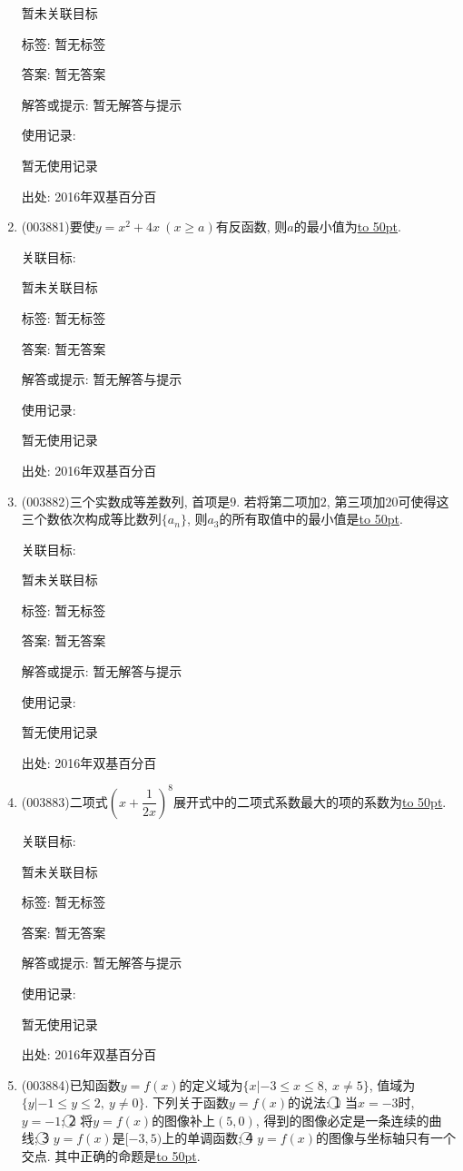 \documentclass[10pt,a4paper]{article}
\newcommand{\blank}[1]{\underline{\hbox to #1pt{}}}
\begin{document}
\begin{enumerate}[1.]
暂未关联目标



标签: 暂无标签

答案: 暂无答案

解答或提示: 暂无解答与提示

使用记录:

暂无使用记录


出处: 2016年双基百分百
\item { (003881)}要使$y=x^2+4x \ (x\ge a)$有反函数, 则$a$的最小值为\blank{50}.


关联目标:

暂未关联目标



标签: 暂无标签

答案: 暂无答案

解答或提示: 暂无解答与提示

使用记录:

暂无使用记录


出处: 2016年双基百分百
\item { (003882)}三个实数成等差数列, 首项是$9$. 若将第二项加$2$, 第三项加$20$可使得这三个数依次构成等比数列$\{a_n\}$, 则$a_3$的所有取值中的最小值是\blank{50}.


关联目标:

暂未关联目标



标签: 暂无标签

答案: 暂无答案

解答或提示: 暂无解答与提示

使用记录:

暂无使用记录


出处: 2016年双基百分百
\item { (003883)}二项式$\left(x+\dfrac 1{2x}\right)^8$展开式中的二项式系数最大的项的系数为\blank{50}.


关联目标:

暂未关联目标



标签: 暂无标签

答案: 暂无答案

解答或提示: 暂无解答与提示

使用记录:

暂无使用记录


出处: 2016年双基百分百
\item { (003884)}已知函数$y=f(x)$的定义域为$\{x|-3\le x\le 8, \ x\ne 5\}$, 值域为$\{y|-1\le y\le 2, \ y\ne 0\}$. 下列关于函数$y=f(x)$的说法: \textcircled{1} 当$x=-3$时, $y=-1$; \textcircled{2} 将$y=f(x)$的图像补上$(5,0)$, 得到的图像必定是一条连续的曲线; \textcircled{3} $y=f(x)$是$[-3,5)$上的单调函数; \textcircled{4} $y=f(x)$的图像与坐标轴只有一个交点. 其中正确的命题是\blank{50}.



\end{enumerate}
\end{document}
